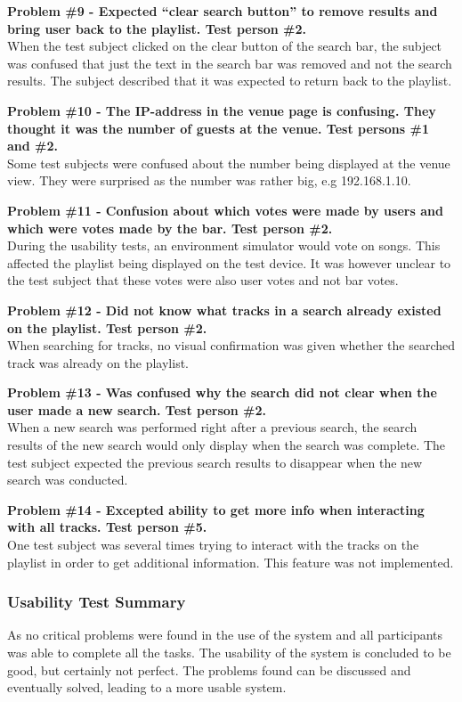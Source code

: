 \noindent\textbf{Problem \#9 - Expected \enquote{clear search button}
  to remove results and bring user back to the playlist. Test person \#2.}\\
  When the test subject clicked on the clear button of the search bar,
  the subject was confused that just the text in the search bar was
  removed and not the search results. The subject described that it
  was expected to return back to the playlist.

\noindent\textbf{Problem \#10 - The IP-address in the venue page is
  confusing. They thought it was the number of guests at the venue. Test persons \#1 and \#2.}\\
  Some test subjects were confused about the number being displayed at
  the venue view. They were surprised as the number was rather big,
  e.g 192.168.1.10.

\noindent\textbf{Problem \#11 - Confusion about which votes were made by users and which were
    votes made by the bar. Test person \#2.}\\
  During the usability tests, an environment simulator would vote on
  songs. This affected the playlist being displayed on the test
  device. It was however unclear to the test subject that these votes
  were also user votes and not bar votes.

\noindent\textbf{Problem \#12 - Did not know what tracks in a search already existed on the
    playlist. Test person \#2.}\\
  When searching for tracks, no visual confirmation was given whether
  the searched track was already on the playlist.

\noindent\textbf{Problem \#13 - Was confused why the search did not
  clear when the user made a new search. Test person \#2.}\\
  When a new search was performed right after a previous search, the
  search results of the new search would only display when the search
  was complete. The test subject expected the previous search results
  to disappear when the new search was conducted.

\noindent\textbf{Problem \#14 - Excepted ability to get more info when interacting with all
    tracks. Test person \#5.}\\
  One test subject was several times trying to interact with the
  tracks on the playlist in order to get additional information. This
  feature was not implemented.

\subsubsection{Usability Test Summary}
As no critical problems were found in the use of the system and all participants was able to complete all the tasks. The usability of the system is concluded to be good, but certainly not perfect. The problems found can be discussed and  eventually solved, leading to a more usable system.

